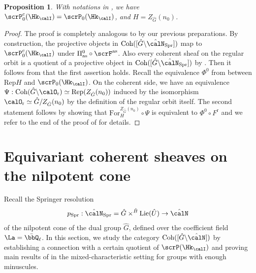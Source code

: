 \documentclass[10pt, reqno]{amsart}
\theoremstyle{plain}
\newtheorem{proposition}[theorem]{Proposition}
\theoremstyle{definition}
\numberwithin{equation}{section}
\begin{document}
\begin{proposition}\label{H_equals_the_full_centralizer}
	With notations in , we have $\scrP_0^c(\Hk_{\calI})=\scrP_0(\Hk_{\calI})$, and $H=Z_{\hat{G}}(n_0)$.  
\end{proposition}
\begin{proof}
	The proof is completely analogous to \cite[Proposition 7.2.8]{AR} by our previous preparations. By construction, the projective objects in
	$\mathrm{Coh}([\hat{G}\backslash\hat{\calN}_\mathrm{Spr}])$ map to $\scrP_0^c(\Hk_{\calI})$ under $\Pi_{\mathrm{as}}^0\circ \scrF^{\mathrm{as}}$. Also every coherent sheaf on the regular orbit is a quotient of a projective object in 	$\mathrm{Coh}([\hat{G}\backslash\hat{\calN}_\mathrm{Spr}])$ by \cite[Lemma 7.2.9]{AR}. Then it follows from  that the first assertion holds. Recall the equivalence $\Phi^0$ from  between $\mathrm{Rep}H$ and $\scrP_0(\Hk_{\calI})$. On the coherent side, we have an equivalence $\Psi: \mathrm{Coh}(\hat{G}\backslash \calO_\mathrm{r})\simeq \mathrm{Rep}(Z_{\hat{G}}(n_0))$ induced by the isomorphism $\calO_{\mathrm{r}}\simeq \hat{G}/Z_{\hat{G}}(n_0)$ by the definition of the regular orbit itself. The second statement follows by showing that $\mathrm{For}^{Z_{\hat{G}}(n_0)}_{H}\circ \Psi$ is equivalent to $ \Phi^0\circ F^\mathrm{r}$ and we refer to the end of the proof of \cite[Proposition 7.2.8]{AR} for details.		
\end{proof}

\section{Equivariant coherent sheaves on the nilpotent cone}
Recall the Springer resolution 
\begin{equation}
	p_\mathrm{Spr}:\hat{\calN}_{\mathrm{Spr}}=\hat{G} \times^{\hat{B}} \mathrm{Lie}(\hat{U})\rightarrow \hat{\calN}
\end{equation}
of the nilpotent cone of the dual group $\hat{G}$, defined over the coefficient field $\La=\bar \bbQ_\ell$. In this section, we study the category $\mathrm{Coh}([\hat{G}\backslash \hat{\calN}])$ by establishing a connection with a certain quotient of $\scrP(\Hk_{\calI})$ and proving main results of \cite{Bez09} in the mixed-characteristic setting for groups with enough minuscules.
\end{document}

